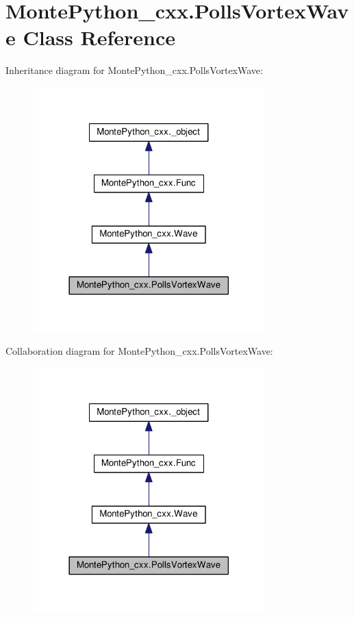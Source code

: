 \hypertarget{classMontePython__cxx_1_1PollsVortexWave}{}\section{Monte\+Python\+\_\+cxx.\+Polls\+Vortex\+Wave Class Reference}
\label{classMontePython__cxx_1_1PollsVortexWave}


Inheritance diagram for Monte\+Python\+\_\+cxx.\+Polls\+Vortex\+Wave\+:
\nopagebreak
\begin{figure}[H]
\begin{center}
\leavevmode
\includegraphics[width=254pt]{classMontePython__cxx_1_1PollsVortexWave__inherit__graph}
\end{center}
\end{figure}


Collaboration diagram for Monte\+Python\+\_\+cxx.\+Polls\+Vortex\+Wave\+:
\nopagebreak
\begin{figure}[H]
\begin{center}
\leavevmode
\includegraphics[width=254pt]{classMontePython__cxx_1_1PollsVortexWave__coll__graph}
\end{center}
\end{figure}
